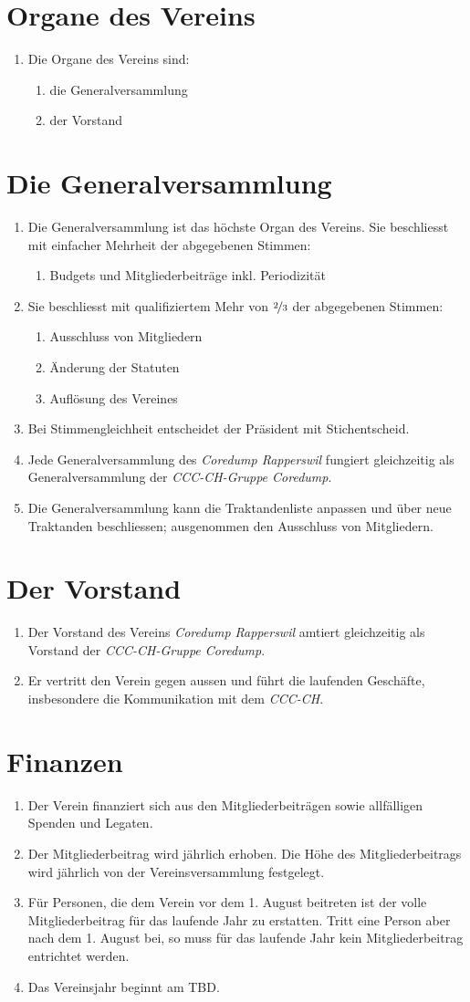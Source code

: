 \documentclass[10pt,a4paper,parskip,fleqn]{scrartcl}
\newcommand{\ol}{\begin{enumerate}[itemsep=-0.2em,topsep=-0.2em]}
\newcommand{\lo}{\end{enumerate}}
\newcommand{\li}{\item}
\newcommand{\name}{CCC-CH-Gruppe Coredump\xspace}
\newcommand{\iname}{\textit{\name}\xspace}
\newcommand{\parent}{Coredump Rapperswil\xspace}
\newcommand{\iparent}{\textit{\parent}\xspace}
\newcommand{\cccch}{CCC-CH\xspace}
\newcommand{\icccch}{\textit{\cccch}\xspace}
\begin{document}
\section{Organe des Vereins}

\ol
	\li Die Organe des Vereins sind:
		\ol
			\li die Generalversammlung
			\li der Vorstand
		\lo
\lo


\section{Die Generalversammlung}

\ol
	\li Die Generalversammlung ist das höchste Organ des Vereins. Sie beschliesst
	mit einfacher Mehrheit der abgegebenen Stimmen:
		\ol
			\li Budgets und Mitgliederbeiträge inkl. Periodizität
		\lo
	\li Sie beschliesst mit qualifiziertem Mehr von $\nicefrac{2}{3}$ der
	abgegebenen Stimmen:
		\ol
			\li Ausschluss von Mitgliedern
			\li Änderung der Statuten
			\li Auflösung des Vereines
		\lo
	\li Bei Stimmengleichheit entscheidet der Präsident mit Stichentscheid.
	\li Jede Generalversammlung des \iparent fungiert gleichzeitig als
	Generalversammlung der \iname.
	\li Die Generalversammlung kann die Traktandenliste anpassen und über neue
	Traktanden beschliessen; ausgenommen den Ausschluss von Mitgliedern.
\lo


\section{Der Vorstand}

\ol
	\li Der Vorstand des Vereins \iparent amtiert gleichzeitig als Vorstand der
	\iname.
	\li Er vertritt den Verein gegen aussen und führt die laufenden Geschäfte,
	insbesondere die Kommunikation mit dem \icccch.
\lo


\section{Finanzen}

\ol
	\li Der Verein finanziert sich aus den Mitgliederbeiträgen sowie allfälligen
	Spenden und Legaten.
	\li Der Mitgliederbeitrag wird jährlich erhoben. Die Höhe des
	Mitgliederbeitrags wird jährlich von der Vereinsversammlung festgelegt.
	\li Für Personen, die dem Verein vor dem 1. August beitreten ist der volle
	Mitgliederbeitrag für das laufende Jahr zu erstatten. Tritt eine Person aber
	nach dem 1. August bei, so muss für das laufende Jahr kein Mitgliederbeitrag
	entrichtet werden.
	\li Das Vereinsjahr beginnt am TBD.
\lo
\end{document}
